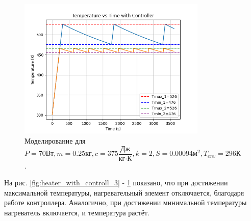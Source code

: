\begin{figure}  %
	\centering
	\includegraphics[width=0.8\textwidth]{imgs/heater_w._controll_1.png}  %
	\caption{Моделирование для 
		\[
		P=70\text{Вт}, m = 0.25\text{кг}, c=375\frac{\text{Дж}}{\text{кг}\cdot\text{К}},k = 2, S = 0.00094 \text{м}^2,T_{env}= 296 \text{К}
		\].}  %
	\label{fig:heater_with_controll_1}  
\end{figure}

На рис. \ref{fig:heater_with_controll_3} -  \ref{fig:heater_with_controll_1} показано, что при достижении максимальной температуры, нагревательный элемент отключается, благодаря работе контроллера. Аналогично, при достижении минимальной температуры нагреватель включается, и температура растёт.